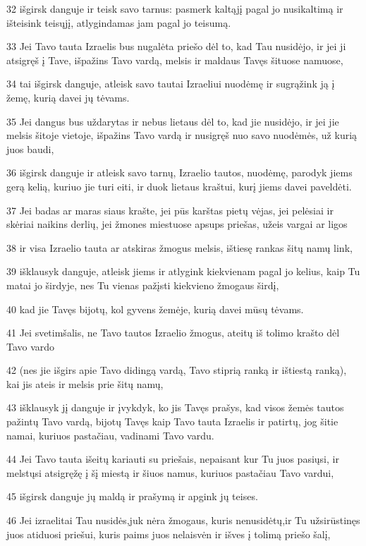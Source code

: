 \par 32 išgirsk danguje ir teisk savo tarnus: pasmerk kaltąjį pagal jo nusikaltimą ir išteisink teisųjį, atlygindamas jam pagal jo teisumą. 
\par 33 Jei Tavo tauta Izraelis bus nugalėta priešo dėl to, kad Tau nusidėjo, ir jei ji atsigręš į Tave, išpažins Tavo vardą, melsis ir maldaus Tavęs šituose namuose, 
\par 34 tai išgirsk danguje, atleisk savo tautai Izraeliui nuodėmę ir sugrąžink ją į žemę, kurią davei jų tėvams. 
\par 35 Jei dangus bus uždarytas ir nebus lietaus dėl to, kad jie nusidėjo, ir jei jie melsis šitoje vietoje, išpažins Tavo vardą ir nusigręš nuo savo nuodėmės, už kurią juos baudi, 
\par 36 išgirsk danguje ir atleisk savo tarnų, Izraelio tautos, nuodėmę, parodyk jiems gerą kelią, kuriuo jie turi eiti, ir duok lietaus kraštui, kurį jiems davei paveldėti. 
\par 37 Jei badas ar maras siaus krašte, jei pūs karštas pietų vėjas, jei pelėsiai ir skėriai naikins derlių, jei žmones miestuose apsups priešas, užeis vargai ar ligos 
\par 38 ir visa Izraelio tauta ar atskiras žmogus melsis, ištiesę rankas šitų namų link, 
\par 39 išklausyk danguje, atleisk jiems ir atlygink kiekvienam pagal jo kelius, kaip Tu matai jo širdyje, nes Tu vienas pažįsti kiekvieno žmogaus širdį, 
\par 40 kad jie Tavęs bijotų, kol gyvens žemėje, kurią davei mūsų tėvams. 
\par 41 Jei svetimšalis, ne Tavo tautos Izraelio žmogus, ateitų iš tolimo krašto dėl Tavo vardo 
\par 42 (nes jie išgirs apie Tavo didingą vardą, Tavo stiprią ranką ir ištiestą ranką), kai jis ateis ir melsis prie šitų namų, 
\par 43 išklausyk jį danguje ir įvykdyk, ko jis Tavęs prašys, kad visos žemės tautos pažintų Tavo vardą, bijotų Tavęs kaip Tavo tauta Izraelis ir patirtų, jog šitie namai, kuriuos pastačiau, vadinami Tavo vardu. 
\par 44 Jei Tavo tauta išeitų kariauti su priešais, nepaisant kur Tu juos pasiųsi, ir melstųsi atsigręžę į šį miestą ir šiuos namus, kuriuos pastačiau Tavo vardui, 
\par 45 išgirsk danguje jų maldą ir prašymą ir apgink jų teises. 
\par 46 Jei izraelitai Tau nusidės,­juk nėra žmogaus, kuris nenusidėtų,­ir Tu užsirūstinęs juos atiduosi priešui, kuris paims juos nelaisvėn ir išves į tolimą priešo šalį, 
